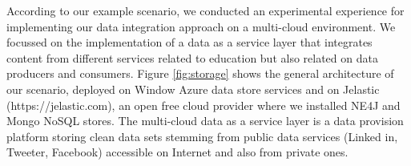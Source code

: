 \begin{figure}
\end{figure}

According to our example scenario, we conducted an experimental experience for implementing our data integration approach on a multi-cloud environment. We focussed on the implementation of a data as a service layer that integrates content from different services related to education but also related on data producers and consumers. Figure \ref{fig:storage} shows the general architecture of our scenario, deployed on Window Azure data store services and on Jelastic (https://jelastic.com), an open free cloud provider where we installed NE4J and Mongo NoSQL stores. The multi-cloud data as a service layer is a data provision platform storing clean data sets stemming from public data services (Linked in, Tweeter, Facebook) accessible on Internet and also from private ones. 

